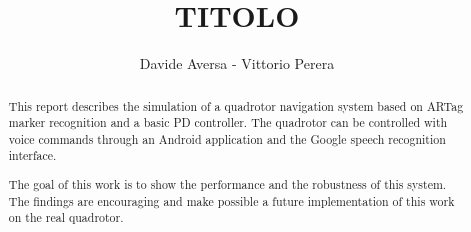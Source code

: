\documentclass[a4paper,10pt]{article}
\title{TITOLO}
\author{Davide Aversa - Vittorio Perera}
\begin{document}
\maketitle

\begin{abstract}

This report describes the simulation of a quadrotor navigation system based on
ARTag marker recognition and a basic PD controller. The quadrotor can be
controlled with voice commands through an Android application and the Google
speech recognition interface.

The goal of this work is to show the performance and the robustness of this
system. The findings are encouraging and make possible a future implementation
of this work on the real quadrotor.

\end{abstract}
















\end{document}
